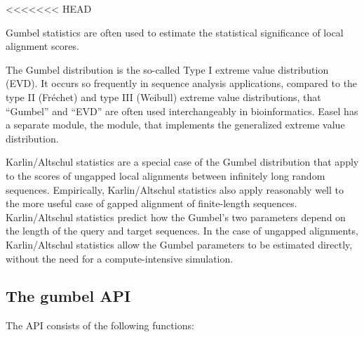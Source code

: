 <<<<<<< HEAD

Gumbel statistics are often used to estimate the statistical
significance of local alignment scores.

The Gumbel distribution is the so-called Type I extreme value
distribution (EVD). It occurs so frequently in sequence analysis
applications, compared to the type II (Fr\'{e}chet) and type III
(Weibull) extreme value distributions, that ``Gumbel'' and ``EVD'' are
often used interchangeably in bioinformatics. Easel has a separate
module, the  module, that implements the generalized
extreme value distribution.

Karlin/Altschul statistics are a special case of the Gumbel
distribution that apply to the scores of ungapped local alignments
between infinitely long random sequences. Empirically, Karlin/Altschul
statistics also apply reasonably well to the more useful case of
gapped alignment of finite-length sequences. Karlin/Altschul
statistics predict how the Gumbel's two parameters depend on the
length of the query and target sequences. In the case of ungapped
alignments, Karlin/Altschul statistics allow the Gumbel parameters to
be estimated directly, without the need for a compute-intensive
simulation.

\subsection{The gumbel API}

The  API consists of the following functions:

